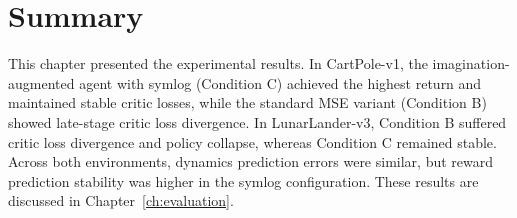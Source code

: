 \section{Summary}
\label{sec:results-summary}

This chapter presented the experimental results. In CartPole-v1, the imagination-augmented agent with symlog (Condition C) achieved the highest return and maintained stable critic losses, while the standard MSE variant (Condition B) showed late-stage critic loss divergence. In LunarLander-v3, Condition B suffered critic loss divergence and policy collapse, whereas Condition C remained stable. Across both environments, dynamics prediction errors were similar, but reward prediction stability was higher in the symlog configuration. These results are discussed in Chapter~\ref{ch:evaluation}.